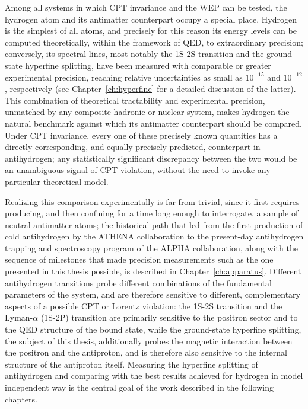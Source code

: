 Among all systems in which CPT invariance and the WEP can be tested, the hydrogen atom and its antimatter counterpart occupy a special place. Hydrogen is the simplest of all atoms, and precisely for this reason its energy levels can be computed theoretically, within the framework of QED, to extraordinary precision; conversely, its spectral lines, most notably the 1S-2S transition and the ground-state hyperfine splitting, have been measured with comparable or greater experimental precision, reaching relative uncertainties as small as $10^{-15}$ and $10^{-12}$, respectively (see Chapter~\ref{ch:hyperfine} for a detailed discussion of the latter). This combination of theoretical tractability and experimental precision, unmatched by any composite hadronic or nuclear system, makes hydrogen the natural benchmark against which its antimatter counterpart should be compared. Under CPT invariance, every one of these precisely known quantities has a directly corresponding, and equally precisely predicted, counterpart in antihydrogen; any statistically significant discrepancy between the two would be an unambiguous signal of CPT violation, without the need to invoke any particular theoretical model.

Realizing this comparison experimentally is far from trivial, since it first requires producing, and then confining for a time long enough to interrogate, a sample of neutral antimatter atoms; the historical path that led from the first production of cold antihydrogen by the ATHENA collaboration to the present-day antihydrogen trapping and spectroscopy program of the ALPHA collaboration, along with the sequence of milestones that made precision measurements such as the one presented in this thesis possible, is described in Chapter~\ref{ch:apparatus}. Different antihydrogen transitions probe different combinations of the fundamental parameters of the system, and are therefore sensitive to different, complementary aspects of a possible CPT or Lorentz violation: the 1S-2S transition and the Lyman-$\alpha$ (1S-2P) transition are primarily sensitive to the positron sector and to the QED structure of the bound state, while the ground-state hyperfine splitting, the subject of this thesis, additionally probes the magnetic interaction between the positron and the antiproton, and is therefore also sensitive to the internal structure of the antiproton itself. Measuring the hyperfine splitting of antihydrogen and comparing with the best results achieved for hydrogen in model independent way is the central goal of the work described in the following chapters.


